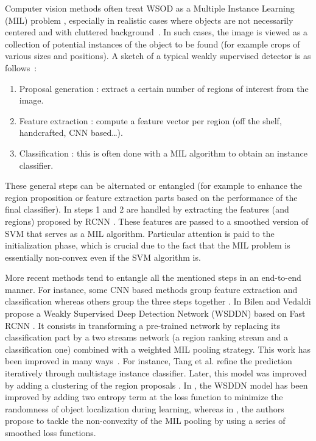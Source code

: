 \documentclass[preprint]{elsarticle}
\begin{document}
Computer vision methods often treat WSOD as a Multiple Instance Learning (MIL) problem \cite{dietterich_solving_1997}, especially in realistic cases where objects are not necessarily centered and with cluttered background~\cite{nguyen_weakly_2009,siva_weakly_2011,song_learning_2014,bilen_weakly_2016}.
In such cases, the image is viewed as a collection of potential instances of the object to be found (for example crops of various sizes and positions). 
A sketch of a typical weakly supervised detector is as follows~:
\begin{enumerate}
\item Proposal generation : extract a certain number of regions of interest from the image. 
\item Feature extraction : compute a feature vector per region (off the shelf, handcrafted, CNN based\dots).
\item Classification : this is often done with a MIL algorithm to obtain an instance classifier.
\end{enumerate}

 These general steps can be alternated or entangled (for example to enhance the region proposition or feature extraction parts based on the performance of the final classifier).
In \cite{song_learning_2014} steps 1 and 2 are handled by extracting the features (and regions) proposed by RCNN \cite{girshick_rich_2014} . These features are passed to a smoothed version of SVM that serves as a MIL algorithm. Particular attention is paid to the initialization phase, which is crucial due to the fact that the MIL problem is essentially non-convex even if the SVM algorithm is. 

More recent methods tend to entangle all the mentioned steps in an end-to-end manner. For instance, some CNN based methods group feature extraction and classification \cite{bilen_weakly_2016,diba_weakly_2017,kantorov_contextlocnet_2016,tang_multiple_2017} whereas others group the three steps together \cite{zhu_soft_2017}. In \cite{bilen_weakly_2016} Bilen and Vedaldi propose a Weakly Supervised Deep Detection Network (WSDDN)  based on Fast RCNN \cite{girshick_fast_2015}. It consists in transforming a pre-trained network by replacing its classification part by a two streams network (a region ranking stream and a classification one) combined with a weighted MIL pooling strategy. 
 This work has been improved in many ways~\cite{wan_minentropy_2018,kantorov_contextlocnet_2016,zhang_zigzag_2018,zhang_w2f_2018,dong_dualnetwork_2017,wan_cmil_2019}. For instance, Tang et al. \cite{tang_weakly_2017} refine the prediction iteratively through multistage instance classifier. Later, this model was improved by adding a clustering of the region proposals \cite{tang_weakly_2018}. In \cite{wan_minentropy_2018}, the WSDDN model has been improved by adding two entropy term at the loss function to minimize the randomness of  object localization during learning, whereas in \cite{wan_cmil_2019}, the authors propose to tackle the non-convexity of the MIL pooling by using a series of smoothed loss functions. 
\end{document}
